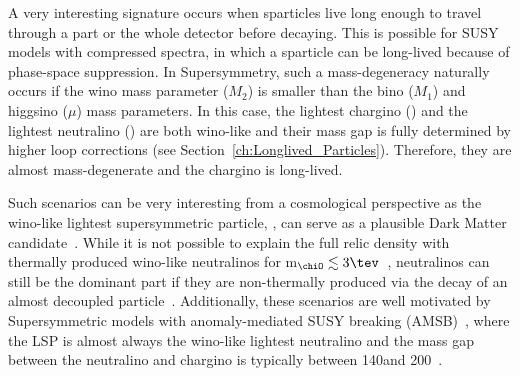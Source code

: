 A very interesting signature occurs when sparticles live long enough to travel through a part or the whole detector before decaying.
This is possible for SUSY models with compressed spectra, in which a sparticle can be long-lived because of phase-space suppression.
In Supersymmetry, such a mass-degeneracy naturally occurs if the wino mass parameter ($M_2$) is smaller than the bino ($M_1$) and higgsino ($\mu$) mass parameters.
In this case, the lightest chargino (\chipm) and the lightest neutralino (\chiO) are both wino-like and their mass gap is fully determined by higher loop corrections (see Section~\ref{ch:Longlived_Particles}). 
Therefore, they are almost mass-degenerate and the chargino is long-lived.

Such scenarios can be very interesting from a cosmological perspective as the wino-like lightest supersymmetric particle, \chiO, can serve as a plausible Dark Matter candidate~\cite{bib:Ibe:DarkMatter_2015,bib:Hisano:DarkMatter_2005}.
While it is not possible to explain the full relic density with thermally produced wino-like neutralinos for m$_{\chiO}\lesssim 3\tev$~\cite{bib:IndirectSearches_Cohen_2013}, neutralinos can still be the dominant part if they are non-thermally produced via the decay of an almost decoupled particle~\cite{bib:Moroi:DarkMatter_1999,bib:Moroi:DarkMatter_2013}.
Additionally, these scenarios are well motivated by Supersymmetric models with anomaly-mediated SUSY breaking (AMSB)~\cite{bib:Theory_AMSB_1998,bib:Theory_AMSB_1999}, where the LSP is almost always the wino-like lightest neutralino and the mass gap between the neutralino and chargino is typically between 140\mev and 200\mev~\cite{bib:Theory_MassGap_2014}.\\

